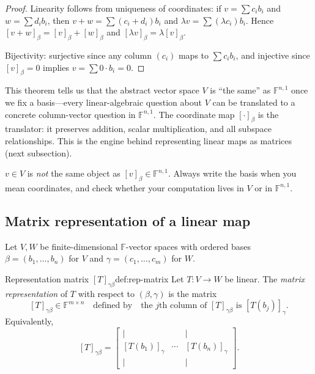 \begin{proof}
Linearity follows from uniqueness of coordinates:
if $v=\sum c_i b_i$ and $w=\sum d_i b_i$, then $v+w=\sum (c_i+d_i)b_i$ and $\lambda v=\sum (\lambda c_i)b_i$.
Hence $[v+w]_\beta=[v]_\beta+[w]_\beta$ and $[\lambda v]_\beta=\lambda [v]_\beta$.

Bijectivity: surjective since any column $(c_i)$ maps to $\sum c_i b_i$, and injective since $[v]_\beta=0$ implies $v=\sum 0\cdot b_i=0$.
\end{proof}

This theorem tells us that the abstract vector space $V$ is ``the same'' as $\mathbb{F}^{n,1}$ once we fix a basis---every linear-algebraic question about $V$ can be translated to a concrete column-vector question in $\mathbb{F}^{n,1}$.
The coordinate map $[\cdot]_\beta$ is the translator: it preserves addition, scalar multiplication, and all subspace relationships.
This is the engine behind representing linear maps as matrices (next subsection).

\begin{commonmistake}[title={Common Mistake: vectors vs.\ coordinates}]
$v\in V$ is \emph{not} the same object as $[v]_\beta\in\mathbb{F}^{n,1}$.
Always write the basis when you mean coordinates, and check whether your computation lives in $V$ or in $\mathbb{F}^{n,1}$.
\end{commonmistake}

\subsection{Matrix representation of a linear map}

Let $V,W$ be finite-dimensional $\mathbb{F}$-vector spaces with ordered bases $\beta=(b_1,\dots,b_n)$ for $V$ and $\gamma=(c_1,\dots,c_m)$ for $W$.

\begin{definition}{Representation matrix $[T]_{\gamma\beta}$}{def:rep-matrix}
Let $T:V\to W$ be linear. The \emph{matrix representation} of $T$ with respect to $(\beta,\gamma)$ is the matrix
\[
[T]_{\gamma\beta}\in \mathbb{F}^{m\times n}
\quad\text{defined by}\quad
\text{the $j$th column of }[T]_{\gamma\beta}\text{ is }[T(b_j)]_\gamma.
\]
Equivalently,
\[
[T]_{\gamma\beta}
=
\begin{bmatrix}
\big| &  & \big|\\
[T(b_1)]_\gamma & \cdots & [T(b_n)]_\gamma\\
\big| &  & \big|
\end{bmatrix}.
\]
\end{definition}

